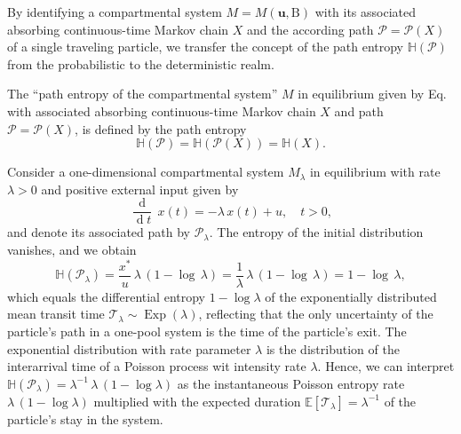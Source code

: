 \documentclass[smallextended]{svjour3}
\makeatletter
\renewcommand*{\eqref}[1]{%
  \hyperref[{#1}]{\textup{\tagform@{\ref*{#1}}}}%
}
\renewcommand{\tens}[1]{\mathrm{#1}}
\renewcommand{\vec}[1]{\mathbf{#1}}
\newcommand{\E}{\mathbb{E}}
\newcommand{\TT}{\mathcal{T}}
\renewcommand{\H}{\mathbb{H}}
\newcommand{\Exp}{\operatorname{Exp}}
\newcommand{\deriv}[1]{\frac{\operatorname{d}}{\operatorname{d}#1}}
\renewcommand{\emph}[1]{``#1''}
\makeatother
\begin{document}
By identifying a compartmental system $M=M(\vec{u},\tens{B})$ with its associated absorbing continuous-time Markov chain $X$ and the according path $\mathcal{P}=\mathcal{P}(X)$ of a single traveling particle, we transfer the concept of the path entropy $\H(\mathcal{P})$ from the probabilistic to the deterministic realm.

\begin{definition}
  The \emph{path entropy of the compartmental system} $M$ in equilibrium given by Eq.~\eqref{eqn:lin_CS_sys} with associated absorbing continuous-time Markov chain $X$ and path $\mathcal{P}=\mathcal{P}(X)$, is defined by the path entropy 
\begin{equation}
  \H(\mathcal{P})=\H(\mathcal{P}(X))=\H(X).
\end{equation}
\end{definition}

Consider a one-dimensional compartmental system $M_\lambda$ in equilibrium with rate $\lambda>0$ and positive external input given by
\begin{equation}
  \deriv{t}\,x(t) = -\lambda\,x(t) + u,\quad t>0,
\end{equation}
and denote its associated path by $\mathcal{P}_\lambda$.
The entropy of the initial distribution vanishes, and we obtain
\begin{equation}
  \H(\mathcal{P}_\lambda) = \frac{x^\ast}{u}\,\lambda\,(1-\log\,\lambda) = \frac{1}{\lambda}\,\lambda\,(1-\log\,\lambda) = 1-\log\,\lambda,
\end{equation}  
which equals the differential entropy $1-\log\lambda$ of the exponentially distributed mean transit time $\TT_\lambda\sim\Exp(\lambda)$, reflecting that the only uncertainty of the particle's path in a one-pool system is the time of the particle's exit.
The exponential distribution with rate parameter $\lambda$ is the distribution of the interarrival time of a Poisson process wit intensity rate $\lambda$.
Hence, we can interpret $\H(\mathcal{P}_\lambda) = \lambda^{-1}\,\lambda\,(1-\log\lambda)$ as the instantaneous Poisson entropy rate $\lambda\,(1-\log\lambda)$ multiplied with the expected duration $\E\left[\TT_{\lambda}\right]=\lambda^{-1}$ of the particle's stay in the system.
\end{document}
